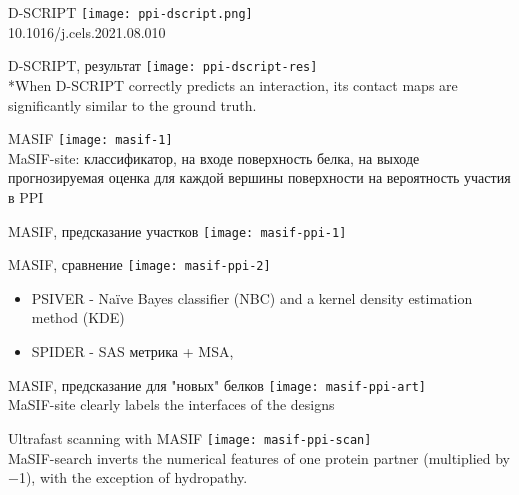 \begin{frame}{D-SCRIPT}
    \texttt{[image: ppi-dscript.png]}\\
    \footnotesize 10.1016/j.cels.2021.08.010
\end{frame}

\begin{frame}{D-SCRIPT, результат}
    \texttt{[image: ppi-dscript-res]}\\
    \footnotesize
    *When D-SCRIPT correctly predicts an interaction, its contact maps are significantly similar to the ground truth.
\end{frame}

\begin{frame}{MASIF}
    \texttt{[image: masif-1]} \\
    MaSIF-site: классификатор, на входе  поверхность белка, на выходе  прогнозируемая оценка для каждой вершины поверхности на
вероятность участия в PPI
\end{frame}

\begin{frame}{MASIF, предсказание участков}
    \centering
    \texttt{[image: masif-ppi-1]}

\end{frame}
        
\begin{frame}{MASIF, сравнение }
    \texttt{[image: masif-ppi-2]}
    \begin{itemize}
        \item PSIVER -  Naïve Bayes classifier  (NBC) and a kernel density estimation method (KDE)
        \item SPIDER -  SAS метрика + MSA, 
    \end{itemize}
\end{frame}

\begin{frame}{MASIF, предсказание для "новых" белков }
    \centering
    \texttt{[image: masif-ppi-art]}\\
    \footnotesize *MaSIF-site clearly labels the interfaces of the designs
\end{frame}

\begin{frame}{Ultrafast scanning with MASIF}
    \texttt{[image: masif-ppi-scan]}\\
    \footnotesize *MaSIF-search inverts the numerical features of one  protein partner (multiplied by −1), with the exception of hydropathy. 
\end{frame}

